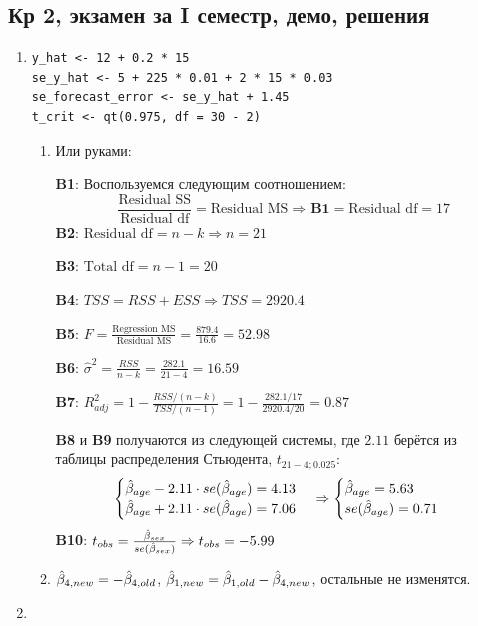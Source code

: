 \documentclass[12pt, a4paper]{article}
\begin{document}
\subsection{Кр 2, экзамен за I семестр, демо, решения}

\begin{enumerate}

\item
\begin{verbatim}
y_hat <- 12 + 0.2 * 15
se_y_hat <- 5 + 225 * 0.01 + 2 * 15 * 0.03
se_forecast_error <- se_y_hat + 1.45
t_crit <- qt(0.975, df = 30 - 2)
\end{verbatim}

\begin{enumerate}
\item
Или руками:

\textbf{B1}: Воспользуемся следующим соотношением:
\[
\frac{\text{Residual SS}}{\text{Residual df}} = \text{Residual MS} \Rightarrow \textbf{B1} = \text{Residual df} = 17
\]
\textbf{B2}: $\text{Residual df} = n - k \Rightarrow n = 21$

\textbf{B3}: $\text{Total df} = n - 1 = 20$

\textbf{B4}: $TSS = RSS + ESS \Rightarrow TSS = 2920.4$

\textbf{B5}: $F = \frac{\text{Regression MS}}{\text{Residual MS}} = \frac{879.4}{16.6} = 52.98$

\textbf{B6}: $\hat{\sigma}^2 = \frac{RSS}{n-k} = \frac{282.1}{21-4} = 16.59$

\textbf{B7}: $R^2_{adj} = 1 - \frac{RSS/(n-k)}{TSS/(n-1)} = 1 - \frac{282.1/17}{2920.4/20} = 0.87$

\textbf{B8} и \textbf{B9} получаются из следующей системы, где $2.11$ берётся из таблицы распределения Стьюдента, $t_{21-4;0.025}$:
\[
\begin{cases}
\hat{\beta}_{age} - 2.11 \cdot se(\hat{\beta}_{age}) = 4.13 \\
\hat{\beta}_{age} + 2.11 \cdot se(\hat{\beta}_{age}) = 7.06
\end{cases}
\Rightarrow
\begin{cases}
\hat{\beta}_{age} = 5.63 \\
se(\hat{\beta}_{age}) = 0.71
\end{cases}
\]
\textbf{B10}: $t_{obs} = \frac{\hat{\beta}_{sex}}{se(\hat{\beta}_{sex})} \Rightarrow t_{obs} = -5.99$
\item $\hat{\beta}_{4, new} = -\hat{\beta}_{4, old}$, $\hat{\beta}_{1, new} = \hat{\beta}_{1, old} - \hat{\beta}_{4, new}$, остальные не изменятся.
\end{enumerate}
\item



\end{enumerate}
\end{document}
